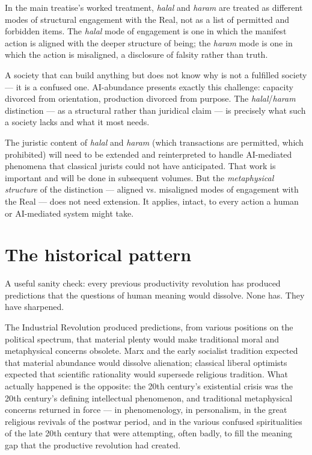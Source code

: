 \documentclass[11pt,a4paper]{article}
\newcommand{\arb}[1]{\textit{#1}}
\begin{document}
In the main treatise's worked treatment, \arb{halal} and
\arb{haram} are treated as different modes of structural
engagement with the Real, not as a list of permitted and forbidden
items. The \arb{halal} mode of engagement is one in which the
manifest action is aligned with the deeper structure of being; the
\arb{haram} mode is one in which the action is misaligned, a
disclosure of falsity rather than truth.

A society that can build anything but does not know why is not a
fulfilled society --- it is a confused one. AI-abundance presents
exactly this challenge: capacity divorced from orientation,
production divorced from purpose. The \arb{halal}/\arb{haram}
distinction --- as a structural rather than juridical claim --- is
precisely what such a society lacks and what it most needs.

The juristic content of \arb{halal} and \arb{haram} (which
transactions are permitted, which prohibited) will need to be
extended and reinterpreted to handle AI-mediated phenomena that
classical jurists could not have anticipated. That work is
important and will be done in subsequent volumes. But the
\textit{metaphysical structure} of the distinction --- aligned vs.
misaligned modes of engagement with the Real --- does not need
extension. It applies, intact, to every action a human or
AI-mediated system might take.

\section{The historical pattern}
\label{sec:historical-pattern}

A useful sanity check: every previous productivity revolution has
produced predictions that the questions of human meaning would
dissolve. None has. They have sharpened.

The Industrial Revolution produced predictions, from various
positions on the political spectrum, that material plenty would
make traditional moral and metaphysical concerns obsolete. Marx
and the early socialist tradition expected that material abundance
would dissolve alienation; classical liberal optimists expected
that scientific rationality would supersede religious tradition.
What actually happened is the opposite: the 20th century's
existential crisis was the 20th century's defining intellectual
phenomenon, and traditional metaphysical concerns returned in
force --- in phenomenology, in personalism, in the great religious
revivals of the postwar period, and in the various confused
spiritualities of the late 20th century that were attempting,
often badly, to fill the meaning gap that the productive
revolution had created.
\end{document}
